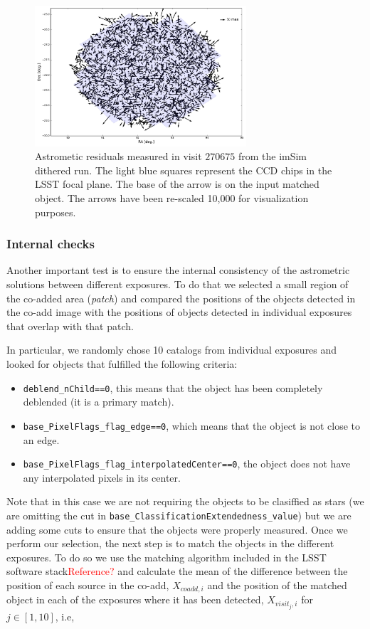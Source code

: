 \documentclass[\docopts]{\docclass}
\begin{document}
\begin{figure}
  \centering
  \includegraphics[width=0.7\textwidth]{astrometry_imsim_dithered_interp}
  \caption{Astrometic residuals measured in visit $270675$ from the imSim dithered run. The light blue squares represent the CCD chips in
  the LSST focal plane. The base of the arrow is on the input matched object. The arrows have been re-scaled 10,000 for visualization purposes.}
  \label{fig:astrometry_c}
\end{figure}


\subsubsection{Internal checks}
\label{sec:internal_astrometry}

Another important test is to ensure the internal consistency of the astrometric solutions between different exposures. To do that we selected
a small region of the co-added area (\textit{patch}) and compared the positions of the objects detected in the co-add
image with the positions of objects detected in individual exposures that overlap with that patch.

In particular, we randomly chose 10 catalogs from individual exposures and looked for objects that fulfilled the following criteria:
\begin{itemize}
  \item \texttt{deblend\_nChild==0}, this means that the object has been completely deblended (it is a primary match).
  \item \texttt{base\_PixelFlags\_flag\_edge==0}, which means that the object is not close to an edge.
  \item \texttt{base\_PixelFlags\_flag\_interpolatedCenter==0}, the object does not have any interpolated pixels in its center.
\end{itemize}

Note that in this case we are not requiring the objects to be clasiffied as stars (we are omitting the cut in
\texttt{base\_ClassificationExtendedness\_value}) but we are adding some cuts to ensure that the objects were properly measured. Once
we perform our selection, the next step is to match the objects in the different exposures. To do so we use the matching algorithm
included in the LSST software stack\textcolor{red}{Reference?} and calculate the mean of the difference between the position of each source
in the co-add, $X_{coadd,i}$ and the position of the matched object in each of the exposures where it has been detected, $X_{visit_{j},i}$
for $j \in [1,10]$, i.e,
\end{document}
